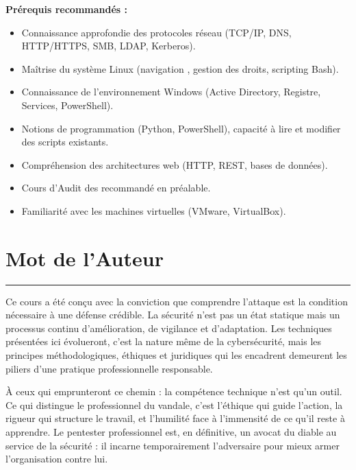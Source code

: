 \begin{boxinfo}
\textbf{Prérequis recommandés :}
\begin{itemize}
    \item Connaissance approfondie des protocoles réseau
          (TCP/IP, DNS, HTTP/HTTPS, SMB, LDAP, Kerberos).
    \item Maîtrise du système Linux (navigation , gestion des droits,
          scripting Bash).
    \item Connaissance de l'environnement Windows (Active Directory, Registre,
          Services, PowerShell).
    \item Notions de programmation (Python, PowerShell), capacité à lire et
          modifier des scripts existants.
    \item Compréhension des architectures web (HTTP,  REST, bases de
          données).
    \item Cours d'Audit des  recommandé en préalable.
    \item Familiarité avec les machines virtuelles (VMware, VirtualBox).
\end{itemize}
\end{boxinfo}

\section*{Mot de l'Auteur}

\vspace{1ex}
\begin{center}
    {\color{CouleurAccent}\rule{0.6\linewidth}{1pt}}
\end{center}
\vspace{1ex}

Ce cours a été conçu avec la conviction que comprendre l'attaque est la condition
nécessaire à une défense crédible. La sécurité n'est pas un état statique mais un
processus continu d'amélioration, de vigilance et d'adaptation. Les techniques
présentées ici évolueront, c'est la nature même de la cybersécurité, mais les
principes méthodologiques, éthiques et juridiques qui les encadrent demeurent les
piliers d'une pratique professionnelle responsable.

À ceux qui emprunteront ce chemin : la compétence technique n'est qu'un outil.
Ce qui distingue le professionnel du vandale, c'est l'éthique qui guide l'action,
la rigueur qui structure le travail, et l'humilité face à l'immensité de ce qu'il
reste à apprendre. Le pentester professionnel est, en définitive, un avocat du
diable au service de la sécurité : il incarne temporairement l'adversaire pour
mieux armer l'organisation contre lui.

